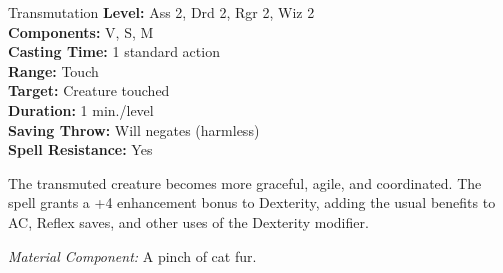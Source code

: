 {Transmutation}
{
	\textbf{Level:}
	Ass 2, Drd 2, Rgr 2, Wiz 2\\
	\textbf{Components:}
	V, S, M\\
	\textbf{Casting Time:}
	1 standard action\\
	\textbf{Range:}
	Touch\\
	\textbf{Target:}
	Creature touched\\
	\textbf{Duration:}
	1 min./level\\
	\textbf{Saving Throw:}
	Will negates (harmless)\\
	\textbf{Spell Resistance:}
	Yes\\
}
{
	The transmuted creature becomes more graceful, agile, and coordinated. The spell grants a +4 enhancement bonus to Dexterity, adding the usual benefits to AC, Reflex saves, and other uses of the Dexterity modifier.

	\textit{Material Component:}
	A pinch of cat fur.

}
